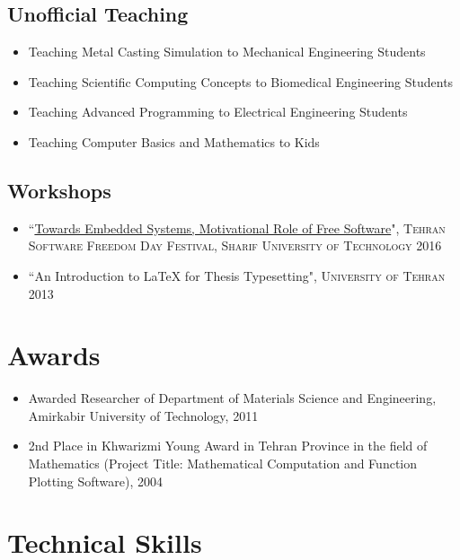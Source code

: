 \documentclass{cv}
\begin{document}
\subsection{Unofficial Teaching}

\begin{itemize}
\item
Teaching Metal Casting Simulation to Mechanical Engineering Students
\item
Teaching Scientific Computing Concepts to Biomedical Engineering Students
\item
Teaching Advanced Programming to Electrical Engineering Students
\item
Teaching Computer Basics and Mathematics to Kids
\end{itemize}

\subsection{Workshops}


\begin{itemize}
\item
``\href{https://www.slideshare.net/tehsfd/embedded-system-70659214}{Towards Embedded Systems, Motivational Role of Free Software}", \textsc{Tehran Software Freedom Day Festival, Sharif University of Technology} \hfill 2016
\item
``An Introduction to \LaTeX{} for Thesis Typesetting", \textsc{University of Tehran} \hfill 2013
\end{itemize}


\section{Awards}

\begin{itemize}
\item
Awarded Researcher of Department of Materials Science and Engineering, Amirkabir University of Technology, 2011
\item
2nd Place in Khwarizmi Young Award in Tehran Province in the field of Mathematics (Project Title: Mathematical Computation and Function Plotting Software), 2004
\end{itemize}


\section{Technical Skills}
\end{document}

